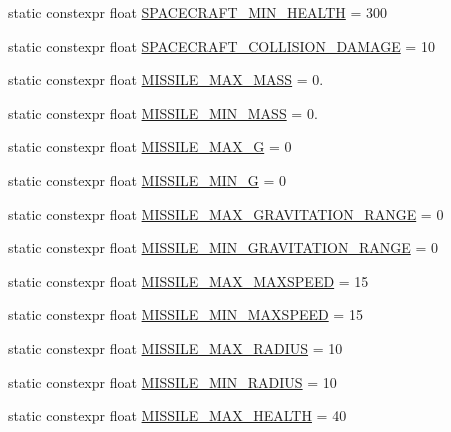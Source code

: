 \begin{DoxyCompactItemize}
\item 
static constexpr float \hyperlink{class_act_conf_a4297e9d1af0a2ee362d5c2d013373042}{S\+P\+A\+C\+E\+C\+R\+A\+F\+T\+\_\+\+M\+I\+N\+\_\+\+H\+E\+A\+L\+T\+H} = 300
\item 
static constexpr float \hyperlink{class_act_conf_a3a85e4db474dcb1a3703edc1c895f0df}{S\+P\+A\+C\+E\+C\+R\+A\+F\+T\+\_\+\+C\+O\+L\+L\+I\+S\+I\+O\+N\+\_\+\+D\+A\+M\+A\+G\+E} = 10
\item 
static constexpr float \hyperlink{class_act_conf_a176080af6ddff6edabb71d31d781bfcd}{M\+I\+S\+S\+I\+L\+E\+\_\+\+M\+A\+X\+\_\+\+M\+A\+S\+S} = 0.
\item 
static constexpr float \hyperlink{class_act_conf_a330af93fea9fd4895071b4bd988db584}{M\+I\+S\+S\+I\+L\+E\+\_\+\+M\+I\+N\+\_\+\+M\+A\+S\+S} = 0.
\item 
static constexpr float \hyperlink{class_act_conf_a1f55dc7f2e844f783030e447610bb6a0}{M\+I\+S\+S\+I\+L\+E\+\_\+\+M\+A\+X\+\_\+\+G} = 0
\item 
static constexpr float \hyperlink{class_act_conf_a559fd3b961a1b22341da5d061fffd93e}{M\+I\+S\+S\+I\+L\+E\+\_\+\+M\+I\+N\+\_\+\+G} = 0
\item 
static constexpr float \hyperlink{class_act_conf_a7d2106da27b339503f3731cad23c061e}{M\+I\+S\+S\+I\+L\+E\+\_\+\+M\+A\+X\+\_\+\+G\+R\+A\+V\+I\+T\+A\+T\+I\+O\+N\+\_\+\+R\+A\+N\+G\+E} = 0
\item 
static constexpr float \hyperlink{class_act_conf_a1a85328ef8b086850d2c0fc3ebfa5351}{M\+I\+S\+S\+I\+L\+E\+\_\+\+M\+I\+N\+\_\+\+G\+R\+A\+V\+I\+T\+A\+T\+I\+O\+N\+\_\+\+R\+A\+N\+G\+E} = 0
\item 
static constexpr float \hyperlink{class_act_conf_ac5ea6500b704b79e8412ee66e904de16}{M\+I\+S\+S\+I\+L\+E\+\_\+\+M\+A\+X\+\_\+\+M\+A\+X\+S\+P\+E\+E\+D} = 15
\item 
static constexpr float \hyperlink{class_act_conf_a7b507c74576f18778abcab3afdadf843}{M\+I\+S\+S\+I\+L\+E\+\_\+\+M\+I\+N\+\_\+\+M\+A\+X\+S\+P\+E\+E\+D} = 15
\item 
static constexpr float \hyperlink{class_act_conf_a6a67afb7a81f414351f52f14557bf05c}{M\+I\+S\+S\+I\+L\+E\+\_\+\+M\+A\+X\+\_\+\+R\+A\+D\+I\+U\+S} = 10
\item 
static constexpr float \hyperlink{class_act_conf_a2c7a233c31e1681105adb42915e8080c}{M\+I\+S\+S\+I\+L\+E\+\_\+\+M\+I\+N\+\_\+\+R\+A\+D\+I\+U\+S} = 10
\item 
static constexpr float \hyperlink{class_act_conf_a1c3c601f0a945dd039e63dfc9c70aba7}{M\+I\+S\+S\+I\+L\+E\+\_\+\+M\+A\+X\+\_\+\+H\+E\+A\+L\+T\+H} = 40

\end{DoxyCompactItemize}
